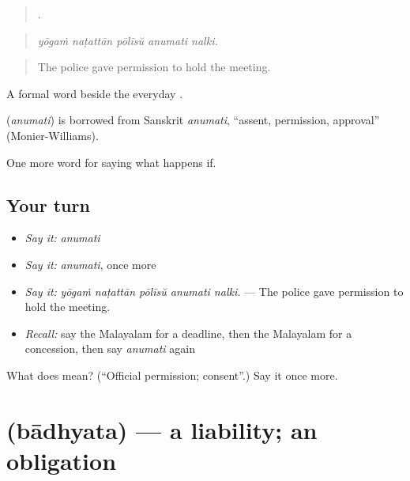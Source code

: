 \begin{quote}
    .
\end{quote}

\begin{quote}
\emph{yōgaṁ naṭattān pōlīsŭ anumati nalki.}
\end{quote}

\begin{quote}
The police gave permission to hold the meeting.
\end{quote}

A formal word beside the everyday .

\begin{cousinweb}
\textbf{} (\emph{anumati}) is borrowed from Sanskrit \emph{anumati}, \textquotedblleft{}assent, permission, approval\textquotedblright{} (Monier-Williams).
\end{cousinweb}

\begin{grammarlens}[title={What you've built}]
One more word for saying what happens if.
\end{grammarlens}

\subsection*{Your turn}
\begin{itemize}
\raggedright
  \item \emph{Say it:} \emph{anumati}
  \item \emph{Say it:} \emph{anumati}, once more
  \item \emph{Say it:} \emph{yōgaṁ naṭattān pōlīsŭ anumati nalki.} — The police gave permission to hold the meeting.
  \item \emph{Recall:} say the Malayalam for a deadline, then the Malayalam for a concession, then say \emph{anumati} again
\end{itemize}

\begin{tcolorbox}[breakable,colback=teal!4,colframe=teal!35!black,title={Before you move on}]
What does  mean? (\textquotedblleft{}Official permission; consent\textquotedblright{}.) Say it once more.
\end{tcolorbox}
\section[\texorpdfstring{\ml{ബാധ്യത} (bādhyata)}{ബാധ്യത (bādhyata)}]{ (bādhyata) — a liability; an obligation}

